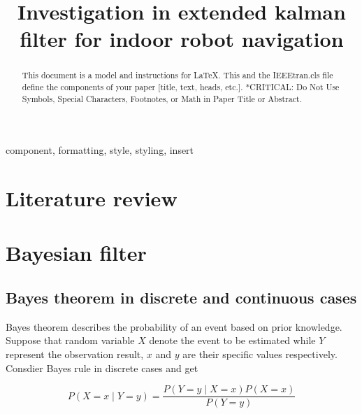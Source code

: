 \documentclass[conference]{IEEEtran}
\begin{document}
	
	\title{Investigation in extended kalman filter for indoor robot navigation\\
	}
	
	\author{
	}
	
	\maketitle
	
	\begin{abstract}
		This document is a model and instructions for \LaTeX.
		This and the IEEEtran.cls file define the components of your paper [title, text, heads, etc.]. *CRITICAL: Do Not Use Symbols, Special Characters, Footnotes, 
		or Math in Paper Title or Abstract.
	\end{abstract}
	
	\begin{IEEEkeywords}
		component, formatting, style, styling, insert
	\end{IEEEkeywords}
	
	\section{Literature review}
	
	\section{Bayesian filter}
	
	\subsection{Bayes theorem in discrete and continuous cases}
	
	Bayes theorem describes the probability of an event based on prior knowledge. Suppose that random variable $X$ denote the event to be estimated while $Y$ represent the observation result, $x$ and $y$ are their specific values respectively. Consdier Bayes rule in discrete cases and get
	
	\begin{equation}
		P(X=x\mid Y=y)=\frac{P(Y=y\mid X=x)P(X=x)}{P(Y=y)}
		\label{eq1}
	\end{equation}
	
\end{document}

